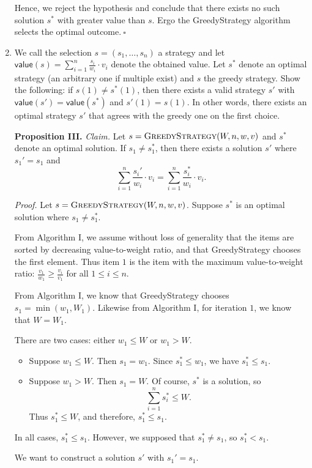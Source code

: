 \begin{enumerate}
\begin{solution}
Hence, we reject the hypothesis and conclude that there exists no such solution $s^*$ with greater value than $s$. Ergo the {\sc GreedyStrategy} algorithm selects the optimal outcome.$~\square$
\end{solution}
\newpage
\item We call the selection $s = (s_1,\ldots,s_n)$ a strategy and let 
$\mathsf{value}(s) = \sum_{i=1}^n \frac{s_i}{w_i} \cdot v_i$ 
denote the obtained value. Let $s^*$ denote an optimal strategy (an arbitrary one if multiple exist) and $s$ the greedy strategy.
Show the following: if $s(1) \neq s^*(1)$, then there exists a valid strategy $s'$ with $\mathsf{value}(s') = \mathsf{value}(s^*)$ and $s'(1) = s(1)$. In other words, there exists an optimal strategy $s'$ that agrees with the greedy one on the first choice.
\begin{solution}
\textbf{Proposition III. }\textit{Claim. }Let $s=\textsc{GreedyStrategy}(W,n,w,v)$ and $s^*$ denote an optimal solution.  If $s_1\neq s^*_1$, then there exists a solution $s'$ where $s_1'=s_1$ and
\[\sum_{i=1}^n\frac{s_i'}{w_i}\cdot v_i=\sum_{i=1}^n\frac{s_i^*}{w_i}\cdot v_i.\]

\textit{Proof. }Let $s=\textsc{GreedyStrategy}(W,n,w,v)$. Suppose $s^*$ is an optimal solution where $s_1\neq s^*_1$. 

From Algorithm I, we assume without loss of generality that the items are sorted by decreasing value-to-weight ratio, and that {\sc GreedyStrategy} chooses the first element. Thus item $1$ is the item with the maximum value-to-weight ratio: $\frac{v_1}{w_1}\geq\frac{v_i}{v_1}$ for all $1\leq i\leq n$.

From Algorithm I, we know that {\sc GreedyStrategy} chooses $s_1=\min(w_1,W_1)$. Likewise from Algorithm I, for iteration $1$, we know that $W=W_1$. 

There are two cases: either $w_1\leq W$ or $w_1>W$.
\begin{itemize}
    \item Suppose $w_1\leq W$. Then $s_1=w_1$. Since $s_1^*\leq w_1$, we have $s_1^*\leq s_1$.
    \item Suppose $w_1>W$. Then $s_1=W$. Of course, $s^*$ is a solution, so \[\sum_{i=1}^n{s^*_i}\leq W.\] Thus $s_1^*\leq W$, and therefore, $s_1^*\leq s_1$. 
\end{itemize}
In all cases, $s_1^*\leq s_1$. However, we supposed that $s_1^*\neq s_1$, so $s_1^*<s_1$.

We want to construct a solution $s'$ with $s_1'=s_1$.


\end{solution}
\end{enumerate}
